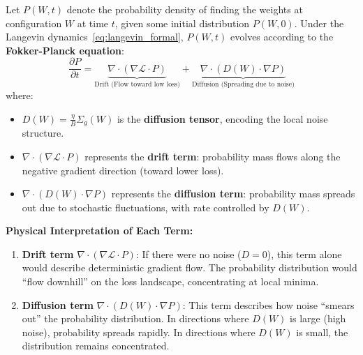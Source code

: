 \documentclass[
  journal=largetwo,
  year=2025,
  volume=37,
]{cup-journal}
\begin{document}
\begin{definition}\label{def:fokker_planck}
Let $P(W, t)$ denote the probability density of finding the weights at configuration $W$ at time $t$, given some initial distribution $P(W, 0)$. Under the Langevin dynamics~\eqref{eq:langevin_formal}, $P(W,t)$ evolves according to the \textbf{Fokker-Planck equation}:
\begin{equation}\label{eq:fokker_planck_formal}
    \boxed{\frac{\partial P}{\partial t} = \underbrace{\nabla \cdot (\nabla \mathcal{L} \cdot P)}_{\text{Drift (Flow toward low loss)}} + \underbrace{\nabla \cdot \left( D(W) \cdot \nabla P \right)}_{\text{Diffusion (Spreading due to noise)}}}
\end{equation}
where:
\begin{itemize}
    \item $D(W) = \frac{\eta}{B} \Sigma_g(W)$ is the \textbf{diffusion tensor}, encoding the local noise structure.
    \item $\nabla \cdot (\nabla \mathcal{L} \cdot P)$ represents the \textbf{drift term}: probability mass flows along the negative gradient direction (toward lower loss).
    \item $\nabla \cdot (D(W) \cdot \nabla P)$ represents the \textbf{diffusion term}: probability mass spreads out due to stochastic fluctuations, with rate controlled by $D(W)$.
\end{itemize}
\end{definition}

\textbf{Physical Interpretation of Each Term:}
\begin{enumerate}
    \item \textbf{Drift term} $\nabla \cdot (\nabla \mathcal{L} \cdot P)$: If there were no noise ($D = 0$), this term alone would describe deterministic gradient flow. The probability distribution would ``flow downhill'' on the loss landscape, concentrating at local minima.
    
    \item \textbf{Diffusion term} $\nabla \cdot (D(W) \cdot \nabla P)$: This term describes how noise ``smears out'' the probability distribution. In directions where $D(W)$ is large (high noise), probability spreads rapidly. In directions where $D(W)$ is small, the distribution remains concentrated.
\end{enumerate}
\end{document}
